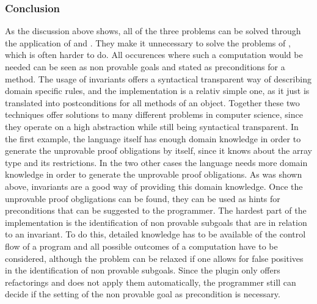 \subsubsection{Conclusion}
As the discussion above shows, all of the three problems can be solved through the application of  and . They make it unnecessary to solve the problems of , which is often harder to do. All occurences where such a computation would be needed can be seen as non provable goals and stated as preconditions for a method. The usage of invariants offers a syntactical  transparent way of describing domain specific rules, and the implementation is a relativ simple one, as it just is translated into postconditions for all methods of an object. Together these two techniques offer solutions to many different problems in computer science, since they operate on a high abstraction while still being syntactical transparent.\newline 
In the first example, the language itself has enough domain knowledge in order to generate the unprovable proof obligations by itself, since it knows about the array type and its restrictions. In the two other cases the language  needs more domain knowledge in order to generate the unprovable proof obligations. As was shown above, invariants are a good way of providing this domain knowledge.
Once the unprovable proof obgligations can be found, they can be used as hints for preconditions that can be suggested to the programmer.\newline
The hardest part of the implementation is the identification of non provable subgoals that are in relation to an invariant. To do this, detailed knowledge has to be available of the control flow of a program and all possible outcomes of a computation have to be considered, although the problem can be relaxed if one allows for false positives in the identification of non provable subgoals. Since the plugin only offers refactorings and does not apply them automatically, the programmer still can decide if the setting of the non provable goal as precondition is necessary.  
